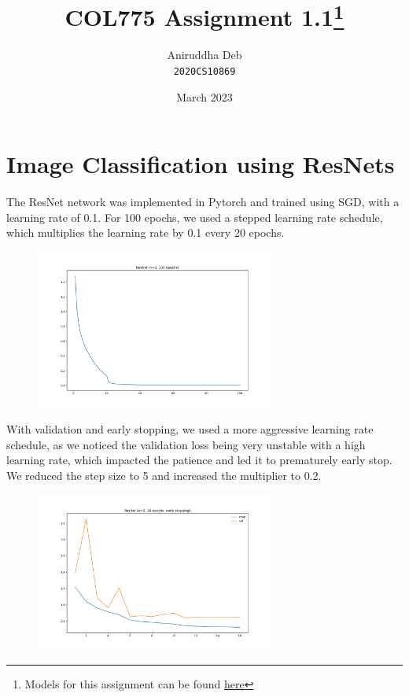 \documentclass[12pt]{article}
\title{\textbf{COL775 Assignment 1.1}\footnote{Models for this assignment can be found \href{https://drive.google.com/drive/folders/14zz1PKcDpUmSjqowXOoAwpHDdQYo3n3x?usp=sharing}{here}}}
\author{Aniruddha Deb \\ \texttt{2020CS10869}}
\date{March 2023}
\begin{document}
\maketitle

\section{Image Classification using ResNets}

The ResNet network was implemented in Pytorch and trained using SGD, with a 
learning rate of 0.1. For 100 epochs, we used a stepped learning rate schedule,
which multiplies the learning rate by 0.1 every 20 epochs.

\begin{figure}[!htbp]
    \centering
    \includegraphics[width=0.7\textwidth]{q1_part2.pdf}
\end{figure}

With validation and early stopping, we used a more aggressive learning rate
schedule, as we noticed the validation loss being very unstable with a high
learning rate, which impacted the patience and led it to prematurely early 
stop. We reduced the step size to 5 and increased the multiplier to 0.2.

\begin{figure}[!htbp]
    \centering
    \includegraphics[width=0.7\textwidth]{q1_part3.pdf}
\end{figure}
\end{document}
